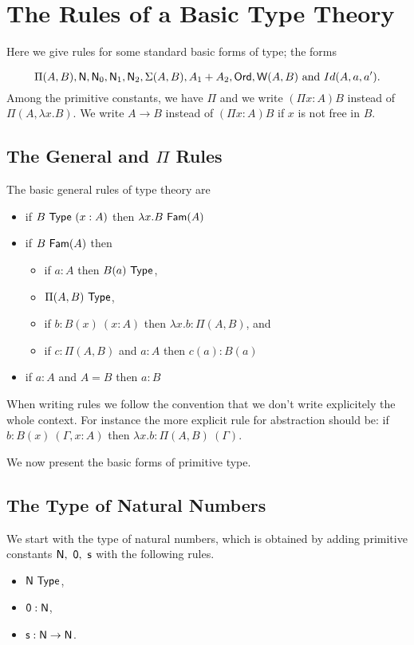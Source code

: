 {\section*{The Rules of a Basic Type Theory}
Here we give rules for some standard basic forms of type; the forms 

  $$\Pi(A,B),{\sf N},{\sf N}_0,{\sf N}_1,{\sf N}_2,\Sigma(A,B),A_1+A_2,{\sf Ord},{\sf W}(A,B)
    \mbox{ and }Id(A,a,a').$$
%
Among the primitive constants, we have $\Pi$ and we write $(\Pi x:A)B$ instead
of $\Pi(A,\lambda x.B)$. We write $A\rightarrow B$ instead of $(\Pi x:A)B$ if
$x$ is not free in $B$.

\medskip

\subsection{The General and $\Pi$ Rules}
 The basic general rules of type theory are 
\begin{itemize}
\item if $B~{\sf Type}~(x:A)$ then $\lambda x.B~{\sf Fam}(A)$
\item if $B~{\sf Fam}(A)$ then 
\begin{itemize}
\item if $a:A$ then $B(a)~{\sf Type}$,
\item $\Pi(A,B)~{\sf Type}$,
\item if $b:B(x)~(x:A)$ then $\lambda x.b:\Pi(A,B)$, and
\item if $c:\Pi(A,B)$ and $a:A$ then $c(a):B(a)$
\end{itemize}
\item if $a:A$ and $A= B$ then $a:B$
\end{itemize}

\medskip

 When writing rules we follow the convention that we don't write explicitely the whole context.  For instance the more explicit rule for abstraction should be: if $b:B(x)~(\Gamma,x:A)$ then $\lambda x.b:\Pi(A,B)~(\Gamma)$.

\medskip

We now present the basic forms of primitive type.  

\subsection*{The Type of Natural Numbers}
We start with
the type of natural numbers, which  is obtained by adding primitive constants
${\sf N},~{\sf 0},~{\sf s}$ with the following rules.
\begin{itemize}
\item ${\sf N}~{\sf Type}$,
\item ${\sf 0}:{\sf N}$,
\item ${\sf s}:{\sf N}\rightarrow {\sf N}$.
\end{itemize}

}
